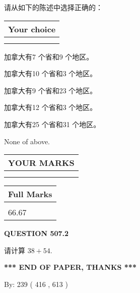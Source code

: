 \documentclass{ctexart}
\begin{document}
  
请从如下的陈述中选择正确的：
  
  
\noindent\hspace{3.0in} \begin{tabular}{|l|}
\hline
Your choice \\
\hline
 \\ 
 \\ 
\hline
\end{tabular}
  
  
 
 
加拿大有7 个省和9 个地区。
 
 
加拿大有10 个省和3 个地区。
 
 
加拿大有9 个省和23 个地区。
 
 
加拿大有12 个省和3 个地区。
 
 
加拿大有25 个省和31 个地区。
 
 
 None of above.
 
 
  
\vspace{0.2in}
  
\noindent\begin{tabular}{|l|}
\hline
 YOUR MARKS  \\
\hline
 \\ 
 \\ 
\hline
\end{tabular}
\hspace{0.05in} \begin{tabular}{|l|}
\hline
 Full Marks  \\
\hline
 \\ 
66.67 \\
\hline
\end{tabular}
{\textbf{\Large{QUESTION
507.2 
}}}
  
  
 
请计算 $ %
38 +  %
54 $.
 

 

 
   
   
 \vspace{0.2in}
 
   
   
   
   
\vspace{1.0in} 
{\textbf{\large{ *** END OF PAPER, THANKS *** }}} 
   
   
\hspace{1.0in} By: 
 239 ( 416 ,  613 )
   
\end{document}
